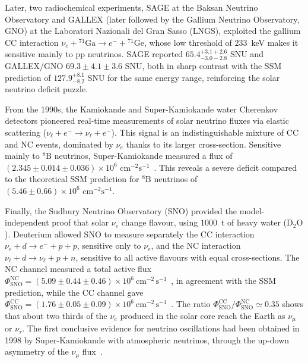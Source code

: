 Later, two radiochemical experiments, SAGE at the Baksan Neutrino Observatory and GALLEX (later followed by the Gallium Neutrino Observatory, GNO) at the Laboratori Nazionali del Gran Sasso (LNGS), exploited the gallium \ac{CC} interaction $\nu_e + {}^{71}\text{Ga} \longrightarrow e^- + {}^{71}\text{Ge}$, whose low threshold of $233$~keV makes it sensitive mainly to \ac{pp} neutrinos. SAGE reported $65.4^{+3.1+2.6}_{-3.0-2.8}$ SNU and GALLEX/GNO $69.3 \pm 4.1 \pm 3.6$ SNU, both in sharp contrast with the \ac{SSM} prediction of $127.9^{+8.1}_{-8.2}$ SNU for the same energy range, reinforcing the solar neutrino deficit puzzle.

From the 1990s, the Kamiokande and Super-Kamiokande water Cherenkov detectors pioneered real-time measurements of solar neutrino fluxes via elastic scattering ($\nu_\ell + e^- \longrightarrow \nu_\ell + e^-$). This signal is an indistinguishable mixture of \ac{CC} and \ac{NC} events, dominated by $\nu_e$ thanks to its larger cross-section. Sensitive mainly to ${}^8\text{B}$ neutrinos, Super-Kamiokande measured a flux of $(2.345 \pm 0.014 \pm 0.036) \times 10^{6} \text{ cm}^{-2}\text{s}^{-1}$~\cite{latestSUPERK}. This reveals a severe deficit compared to the theoretical \ac{SSM} prediction for ${}^8\text{B}$ neutrinos of $(5.46 \pm 0.66) \times 10^{6} \text{ cm}^{-2}\text{s}^{-1}$.

Finally, the Sudbury Neutrino Observatory (SNO) provided the model-independent proof that solar $\nu_e$ change flavour, using $1000$~t of heavy water ($\text{D}_2\text{O}$). Deuterium allowed SNO to measure separately the \ac{CC} interaction $\nu_e + d \to e^- + p + p$, sensitive only to $\nu_e$, and the \ac{NC} interaction $\nu_\ell + d \to \nu_\ell + p + n$, sensitive to all active flavours with equal cross-sections. The \ac{NC} channel measured a total active flux $\Phi_\text{SNO}^\text{NC} = (5.09 \pm 0.44 \pm 0.46) \times 10^{6}~\text{cm}^{-2}\, \text{s}^{-1}$~\cite{SNO2002-results}, in agreement with the \ac{SSM} prediction, while the \ac{CC} channel gave $\Phi_\text{SNO}^\text{CC} = (1.76 \pm 0.05 \pm 0.09) \times 10^{6}~\text{cm}^{-2}\,\text{s}^{-1}$~\cite{SNO2002-results}. The ratio $\Phi^\text{CC}_\text{SNO}/\Phi^\text{NC}_\text{SNO}  \simeq 0.35$ shows that about two thirds of the $\nu_e$ produced in the solar core reach the Earth as $\nu_\mu$ or $\nu_\tau$. The first conclusive evidence for neutrino oscillations had been obtained in 1998 by Super-Kamiokande with atmospheric neutrinos, through the up-down asymmetry of the $\nu_\mu$ flux~\cite{SuperK1998}.

